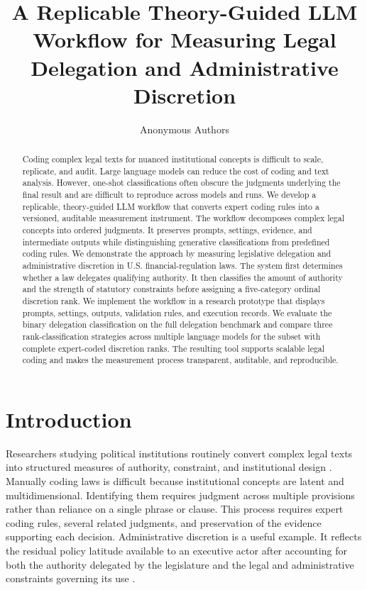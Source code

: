 \documentclass[runningheads]{llncs}
\title{A Replicable Theory-Guided LLM Workflow for Measuring Legal Delegation and Administrative Discretion}
\author{Anonymous Authors}
\institute{}
\begin{document}
\maketitle

\begin{abstract}

Coding complex legal texts for nuanced institutional concepts is difficult to scale, replicate, and audit. Large language models can reduce the cost of coding and text analysis. However, one-shot classifications often obscure the judgments underlying the final result and are difficult to reproduce across models and runs. We develop a replicable, theory-guided LLM workflow that converts expert coding rules into a versioned, auditable measurement instrument. The workflow decomposes complex legal concepts into ordered judgments. It preserves prompts, settings, evidence, and intermediate outputs while distinguishing generative classifications from predefined coding rules. We demonstrate the approach by measuring legislative delegation and administrative discretion in U.S. financial-regulation laws. The system first determines whether a law delegates qualifying authority. It then classifies the amount of authority and the strength of statutory constraints before assigning a five-category ordinal discretion rank. We implement the workflow in a research prototype that displays prompts, settings, outputs, validation rules, and execution records. We evaluate the binary delegation classification on the full delegation benchmark and compare three rank-classification strategies across multiple language models for the subset with complete expert-coded discretion ranks. The resulting tool supports scalable legal coding and makes the measurement process transparent, auditable, and reproducible.
\end{abstract}



\section{Introduction}

Researchers studying political institutions routinely convert complex legal texts into structured measures of authority, constraint, and institutional design \cite{grimmer2013text}. Manually coding laws is difficult because institutional concepts are latent and multidimensional. Identifying them requires judgment across multiple provisions rather than reliance on a single phrase or clause. This process requires expert coding rules, several related judgments, and preservation of the evidence supporting each decision. Administrative discretion is a useful example. It reflects the residual policy latitude available to an executive actor after accounting for both the authority delegated by the legislature and the legal and administrative constraints governing its use \cite{epstein1999delegating,ohalloran2015banking}.
\end{document}
